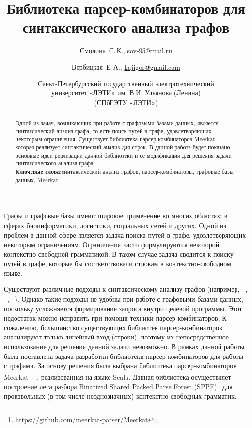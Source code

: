 \documentclass [a4paper] {article}
\title %
  {Библиотека парсер-комбинаторов для синтаксического анализа графов}
\author %
{%
  Смолина~С.\,К., \url {sov-95@mail.ru} \and %
  Вербицкая~Е.\,А., \url {kajigor@gmail.com} \and %
  Санкт-Петербургский государственный электротехнический
  \\университет «ЛЭТИ» им. В.И. Ульянова (Ленина)
  \\(СПбГЭТУ «ЛЭТИ») \\
}%
\date {}    %
\begin{document}

\maketitle

\begin {abstract}
  Одной из задач, возникающих при работе с графовыми базами данных, является синтаксический анализ графа, то есть поиск путей в графе, удовлетворяющих некоторым ограничения. Существует библиотека парсер-комбинаторов Meerkat, которая реализует синтаксический анализ для строк. В данной работе будет показано основные идеи реализации данной библиотеки и её модификация для решения задачи синтаксического анализа графа.
  \\ \textbf {Ключевые слова:}синтаксический анализ графов, парсер-комбинаторы, графовые базы данных, Meerkat.
\end {abstract}

Графы и графовые базы имеют широкое применение во многих областях: в сферах биоинформатики, логистики, социальных сетей и других. Одной из проблем в данной сфере является задача поиска путей в графе, удовлетворяющих некоторым ограничениям. Ограничения часто формулируются некоторой контекстно-свободной грамматикой. В таком случае задача сводится к поиску путей в графе, которые бы соответствовали строкам в контекстно-свободном языке.


Существуют различные подходы к синтаксическому анализу графов (например, ~\cite{smolina-spbgetu-hellings}, ~\cite{smolina-spbgetu-graph-parsing}, ~\cite{smolina-spbgetu-sevon}). Однако такие подходы не удобны при работе с графовыми базами данных, поскольку усложняется формирование запроса внутри целевой программы. Этот недостаток можно исправить при помощи техники парсер-комбинаторов. К сожалению, большинство существующих библиотек парсер-комбинаторов анализируют только линейный вход (строки), поэтому их непосредственное использование для решения данной задачи невозможно. В рамках данной работы была поставлена задача разработки библиотеки парсер-комбинаторов для работы с графами.
За основу решения была выбрана библиотека парсер-комбинаторов Meerkat\footnote{https://github.com/meerkat-parser/Meerkat} ~\cite{smolina-spbgetu-meerkat}, реализованная на языке Scala. Данная библиотека осуществляет построение леса разбора Binarized Shared Packed Parse Forest (SPPF)~\cite{smolina-spbgetu-sppf} для произвольных (в том числе неоднозначных) контекстно-свободных грамматик.
\end{document}
